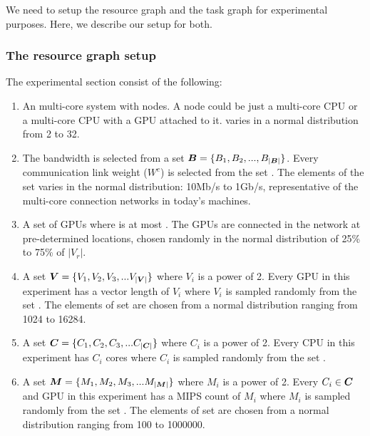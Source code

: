 We need to setup the resource graph and the task graph for experimental
purposes. Here, we describe our setup for both.

\subsubsection{The resource graph setup}
\label{sec:resource-graph-setup}

The experimental section consist of the following:

\begin{enumerate}

\item An multi-core system with \numtplgynodes nodes. A node could be
  just a multi-core CPU or a multi-core CPU with a GPU attached to
  it. \numtplgynodes varies in a normal distribution from 2 to 32.

\item The bandwidth is selected from a set \mbox{$\bm{B} = \{B_1, B_2, ...,
  B_{|\bm{B}|}\}$}. Every communication link weight ($W^c$) is selected
from the set \bwset. The elements of the set \bwset varies in the normal
distribution: 10Mb/s to 1Gb/s, representative of the multi-core
connection networks in today's machines.

\item A set of \gpunum GPUs where \gpunum is at most \numtplgynodes. The
  GPUs are connected in the network at pre-determined locations, chosen
  randomly in the normal distribution of 25\% to 75\% of $|V_r|$.

\item A set $\bm{V} = \{V_1, V_2, V_3, ... V_{|\bm{V}|}\}$ where
  $V_i$ is a power of 2.  Every GPU in this experiment has a vector
  length of $V_i$ where $V_i$ is sampled randomly from the set
  \veclenset. The elements of set \veclenset are chosen from a normal
  distribution ranging from 1024 to 16284.

\item A set $\bm{C} = \{C_1, C_2, C_3, ... C_{|\bm{C}|}\}$
  where $C_i$ is a power of 2.  Every CPU in this experiment has $C_i$
  cores where $C_i$ is sampled randomly from the set \corenumset.

\item A set $\bm{M} = \{M_1, M_2, M_3, ... M_{|\bm{M}|}\}$ where
  $M_i$ is a power of 2.  Every $C_i \in \bm{C}$ and GPU in this
  experiment has a MIPS count of $M_i$ where $M_i$ is sampled randomly
  from the set \mipsset. The elements of set \mipsset are chosen from a
  normal distribution ranging from 100 to 1000000.

\end{enumerate}

